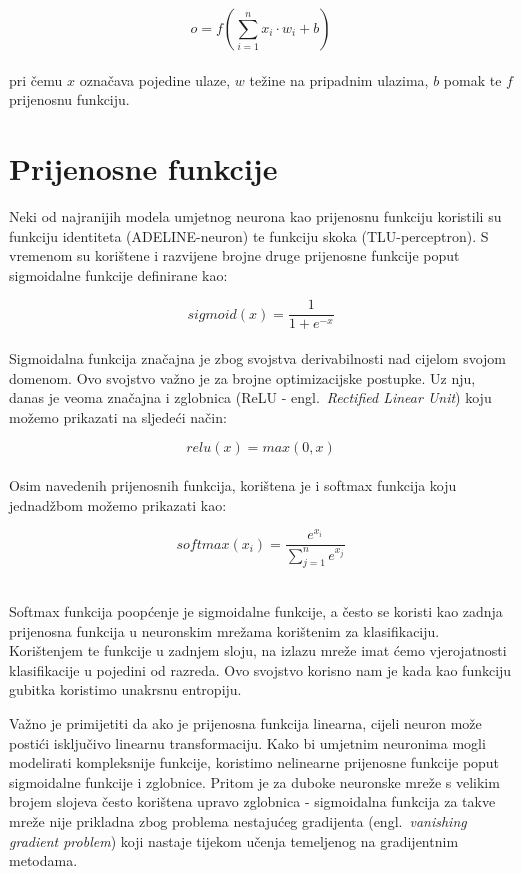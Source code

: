\documentclass[times, utf8, zavrsni, numeric]{fer}
\begin{document}
\begin{equation}
    o = f(\sum_{i=1}^{n}x_{i} \cdot w_{i} + b)
    \label{eq:neuron}
\end{equation}
\\
\noindent pri čemu $x$ označava pojedine ulaze, $w$ težine na pripadnim ulazima, $b$ pomak te $f$ prijenosnu funkciju. 

\section{Prijenosne funkcije}
Neki od najranijih modela umjetnog neurona kao prijenosnu funkciju koristili su funkciju identiteta (ADELINE-neuron) te funkciju skoka (TLU-perceptron).
S vremenom su korištene i razvijene brojne druge prijenosne funkcije poput sigmoidalne funkcije definirane kao:

\begin{equation}
    sigmoid(x) = \frac{1}{1 + e^{-x}}
    \label{eq:sigmoid}
\end{equation}
\\
Sigmoidalna funkcija značajna je zbog svojstva derivabilnosti nad cijelom svojom domenom. Ovo svojstvo važno je za brojne optimizacijske postupke.
Uz nju, danas je veoma značajna i zglobnica (ReLU - engl.\ \textit{Rectified Linear Unit}) koju možemo prikazati na sljedeći način:

\begin{equation}
    relu(x) = max(0, x)
    \label{eq:relu}
\end{equation}
\\
Osim navedenih prijenosnih funkcija, korištena je i softmax funkcija koju jednadžbom možemo prikazati kao:

\begin{equation}
    softmax(x_{i}) = \frac{e^{x_{i}}}{\sum_{j=1}^{n}e^{x_{j}}}
    \label{eq:softmax}
\end{equation}
\\
\pagebreak

Softmax funkcija poopćenje je sigmoidalne funkcije, a često se koristi kao zadnja prijenosna funkcija u neuronskim mrežama korištenim za klasifikaciju.
Korištenjem te funkcije u zadnjem sloju, na izlazu mreže imat ćemo vjerojatnosti klasifikacije u pojedini od razreda. Ovo svojstvo korisno nam je kada kao funkciju gubitka koristimo unakrsnu entropiju.

Važno je primijetiti da ako je prijenosna funkcija linearna, cijeli neuron može postići isključivo linearnu transformaciju. 
Kako bi umjetnim neuronima mogli modelirati kompleksnije funkcije, koristimo nelinearne prijenosne funkcije poput sigmoidalne funkcije i zglobnice. 
Pritom je za duboke neuronske mreže s velikim brojem slojeva često korištena upravo zglobnica - 
sigmoidalna funkcija za takve mreže nije prikladna zbog problema nestajućeg gradijenta (engl.\ \textit{vanishing gradient problem}) koji nastaje tijekom učenja temeljenog na gradijentnim metodama.
\end{document}
